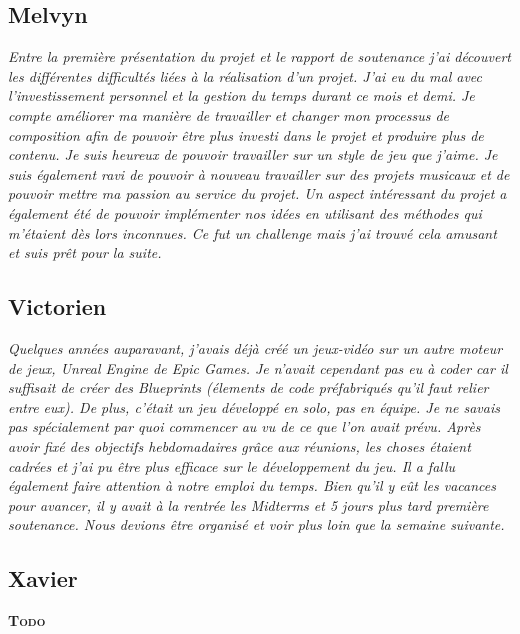 \documentclass[12pt,a4paper]{article}
\begin{document}
    \subsection{Melvyn}
        \textit{Entre la première présentation du projet et le rapport de soutenance
        j'ai découvert les différentes difficultés liées à la réalisation d'un projet.
        J'ai eu du mal avec l'investissement personnel et la gestion du temps durant 
        ce mois et demi. Je compte améliorer ma manière de travailler et changer mon
        processus de composition afin de pouvoir être plus investi dans le projet et 
        produire plus de contenu. Je suis heureux de pouvoir travailler sur un style de 
        jeu que j'aime. Je suis également ravi de pouvoir à nouveau travailler sur des
        projets musicaux et de pouvoir mettre ma passion au service du projet.
        Un aspect intéressant du projet a également été de pouvoir implémenter nos idées
        en utilisant des méthodes qui m'étaient dès lors inconnues. Ce fut un challenge 
        mais j'ai trouvé cela amusant et suis prêt pour la suite.}
 
    \subsection{Victorien}
        \textit{Quelques années auparavant, j’avais déjà créé un jeux-vidéo 
        sur un autre moteur de jeux, \textsl{Unreal Engine} de \textsl{Epic Games}. 
        Je n’avait cependant pas eu à coder car il suffisait de créer des
        \textsl{Blueprints} (élements de code préfabriqués qu’il faut relier 
        entre eux). De plus, c’était un jeu développé en solo, pas en équipe.
        Je ne savais pas spécialement par quoi commencer au vu de ce que l’on
        avait prévu. Après avoir fixé des objectifs hebdomadaires grâce aux 
        réunions, les choses étaient cadrées et j’ai pu être plus efficace sur
        le développement du jeu. Il a fallu également faire attention à notre 
        emploi du temps. Bien qu’il y eût les vacances pour avancer, il y avait 
        à la rentrée les Midterms et 5 jours plus tard première soutenance. 
        Nous devions être organisé et voir plus loin que la semaine suivante.}
  
    \subsection{Xavier}
        \textbf{\textsc{Todo}}

\clearpage
\end{document}

